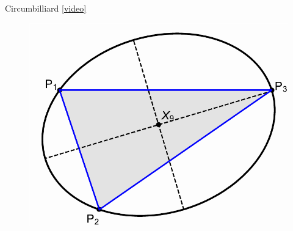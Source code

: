 \begin{frame}{Circumbilliard \href{https://youtu.be/vSCnorIJ2X8}{[video]}}
\begin{figure}
\includegraphics[height=.7\textheight]{pics/0056_circumplot.pdf}
\end{figure}
\end{frame}